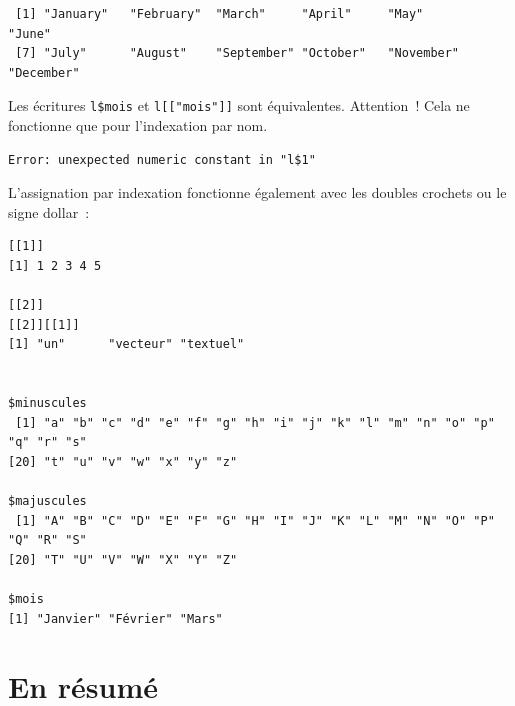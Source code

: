 \documentclass[
  letterpaper,
  DIV=11,
  numbers=noendperiod,
  oneside]{scrreprt}
\newenvironment{Shaded}{\begin{snugshade}}{\end{snugshade}}
\newcommand{\DecValTok}[1]{\textcolor[rgb]{0.68,0.00,0.00}{#1}}
\newcommand{\FunctionTok}[1]{\textcolor[rgb]{0.28,0.35,0.67}{#1}}
\newcommand{\NormalTok}[1]{\textcolor[rgb]{0.00,0.23,0.31}{#1}}
\newcommand{\OtherTok}[1]{\textcolor[rgb]{0.00,0.23,0.31}{#1}}
\newcommand{\SpecialCharTok}[1]{\textcolor[rgb]{0.37,0.37,0.37}{#1}}
\newcommand{\StringTok}[1]{\textcolor[rgb]{0.13,0.47,0.30}{#1}}
\begin{document}
\begin{verbatim}
 [1] "January"   "February"  "March"     "April"     "May"       "June"     
 [7] "July"      "August"    "September" "October"   "November"  "December" 
\end{verbatim}

Les écritures \texttt{l\$mois} et \texttt{l{[}{[}"mois"{]}{]}} sont
équivalentes. Attention~! Cela ne fonctionne que pour l'indexation par
nom.

\begin{Shaded}
\end{Shaded}

\begin{verbatim}
Error: unexpected numeric constant in "l$1"
\end{verbatim}

L'assignation par indexation fonctionne également avec les doubles
crochets ou le signe dollar~:

\begin{Shaded}
\end{Shaded}

\begin{verbatim}
[[1]]
[1] 1 2 3 4 5

[[2]]
[[2]][[1]]
[1] "un"      "vecteur" "textuel"


$minuscules
 [1] "a" "b" "c" "d" "e" "f" "g" "h" "i" "j" "k" "l" "m" "n" "o" "p" "q" "r" "s"
[20] "t" "u" "v" "w" "x" "y" "z"

$majuscules
 [1] "A" "B" "C" "D" "E" "F" "G" "H" "I" "J" "K" "L" "M" "N" "O" "P" "Q" "R" "S"
[20] "T" "U" "V" "W" "X" "Y" "Z"

$mois
[1] "Janvier" "Février" "Mars"   
\end{verbatim}

\hypertarget{en-ruxe9sumuxe9-1}{%
\section{En résumé}\label{en-ruxe9sumuxe9-1}}
\end{document}
